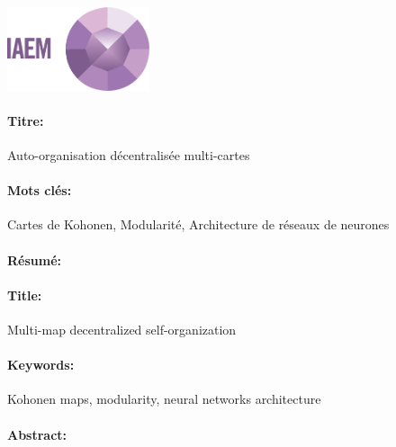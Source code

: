 \lhead{}
\rhead{}
\rfoot{}
\cfoot{}
\lfoot{}

\noindent 
\includegraphics[height=2.45cm]{IAEM}
\vspace{1cm}

\begin{mdframed}[linecolor=Prune,linewidth=1]
\vspace{-.25cm}
\paragraph*{Titre:} Auto-organisation décentralisée multi-cartes

\begin{small}
\vspace{-.25cm}
\paragraph*{Mots clés:} Cartes de Kohonen, Modularité, Architecture de réseaux de neurones

\vspace{-.5cm}
\begin{multicols}{2}
\paragraph*{Résumé:} 
\end{multicols}
\end{small}
\end{mdframed}

\begin{mdframed}[linecolor=Prune,linewidth=1]
\vspace{-.25cm}
\paragraph*{Title:} Multi-map decentralized self-organization

\begin{small}
\vspace{-.25cm}
\paragraph*{Keywords:} Kohonen maps, modularity, neural networks architecture

\vspace{-.5cm}
\begin{multicols}{2}
\paragraph*{Abstract:} 
\end{multicols}
\end{small}
\end{mdframed}

